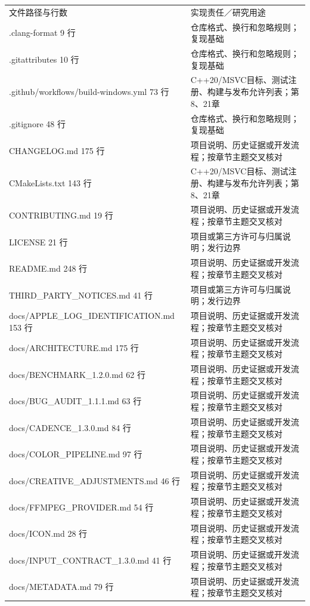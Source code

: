 \documentclass[UTF8,zihao=-4,openany]{ctexbook}
\begin{document}
\begin{longtable}{p{.43\linewidth}p{.47\linewidth}}\toprule
文件路径与行数 & 实现责任／研究用途\\
.clang-format
9 行 & 仓库格式、换行和忽略规则；复现基础\\
.gitattributes
10 行 & 仓库格式、换行和忽略规则；复现基础\\
.github/workflows/build-windows.yml
73 行 & C++20/MSVC目标、测试注册、构建与发布允许列表；第8、21章\\
.gitignore
48 行 & 仓库格式、换行和忽略规则；复现基础\\
CHANGELOG.md
175 行 & 项目说明、历史证据或开发流程；按章节主题交叉核对\\
CMakeLists.txt
143 行 & C++20/MSVC目标、测试注册、构建与发布允许列表；第8、21章\\
CONTRIBUTING.md
19 行 & 项目说明、历史证据或开发流程；按章节主题交叉核对\\
LICENSE
21 行 & 项目或第三方许可与归属说明；发行边界\\
README.md
248 行 & 项目说明、历史证据或开发流程；按章节主题交叉核对\\
THIRD\_PARTY\_NOTICES.md
41 行 & 项目或第三方许可与归属说明；发行边界\\
docs/APPLE\_LOG\_IDENTIFICATION.md
153 行 & 项目说明、历史证据或开发流程；按章节主题交叉核对\\
docs/ARCHITECTURE.md
175 行 & 项目说明、历史证据或开发流程；按章节主题交叉核对\\
docs/BENCHMARK\_1.2.0.md
62 行 & 项目说明、历史证据或开发流程；按章节主题交叉核对\\
docs/BUG\_AUDIT\_1.1.1.md
63 行 & 项目说明、历史证据或开发流程；按章节主题交叉核对\\
docs/CADENCE\_1.3.0.md
84 行 & 项目说明、历史证据或开发流程；按章节主题交叉核对\\
docs/COLOR\_PIPELINE.md
97 行 & 项目说明、历史证据或开发流程；按章节主题交叉核对\\
docs/CREATIVE\_ADJUSTMENTS.md
46 行 & 项目说明、历史证据或开发流程；按章节主题交叉核对\\
docs/FFMPEG\_PROVIDER.md
54 行 & 项目说明、历史证据或开发流程；按章节主题交叉核对\\
docs/ICON.md
28 行 & 项目说明、历史证据或开发流程；按章节主题交叉核对\\
docs/INPUT\_CONTRACT\_1.3.0.md
41 行 & 项目说明、历史证据或开发流程；按章节主题交叉核对\\
docs/METADATA.md
79 行 & 项目说明、历史证据或开发流程；按章节主题交叉核对\\

\end{longtable}
\end{document}
